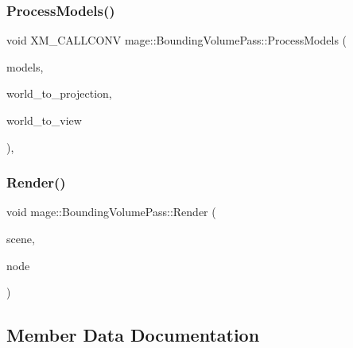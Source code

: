 \subsubsection{\texorpdfstring{Process\+Models()}{ProcessModels()}}
{\footnotesize\ttfamily void X\+M\+\_\+\+C\+A\+L\+L\+C\+O\+NV mage\+::\+Bounding\+Volume\+Pass\+::\+Process\+Models (\begin{DoxyParamCaption}\item[{const vector$<$ const \hyperlink{classmage_1_1_model_node}{Model\+Node} $\ast$ $>$ \&}]{models,  }\item[{F\+X\+M\+M\+A\+T\+R\+IX}]{world\+\_\+to\+\_\+projection,  }\item[{F\+X\+M\+M\+A\+T\+R\+IX}]{world\+\_\+to\+\_\+view }\end{DoxyParamCaption})\hspace{0.3cm}{\ttfamily [private]}, {\ttfamily [noexcept]}}

\hypertarget{classmage_1_1_bounding_volume_pass_a080c5ff2f2f8038e48e6338d9c8f3ebe}{}\label{classmage_1_1_bounding_volume_pass_a080c5ff2f2f8038e48e6338d9c8f3ebe} 
\subsubsection{\texorpdfstring{Render()}{Render()}}
{\footnotesize\ttfamily void mage\+::\+Bounding\+Volume\+Pass\+::\+Render (\begin{DoxyParamCaption}\item[{const \hyperlink{structmage_1_1_pass_buffer}{Pass\+Buffer} $\ast$}]{scene,  }\item[{const \hyperlink{classmage_1_1_camera_node}{Camera\+Node} $\ast$}]{node }\end{DoxyParamCaption})}



\subsection{Member Data Documentation}
\hypertarget{classmage_1_1_bounding_volume_pass_a1cb4768ff21923ea947ff07483c3dec3}{}\label{classmage_1_1_bounding_volume_pass_a1cb4768ff21923ea947ff07483c3dec3} 
